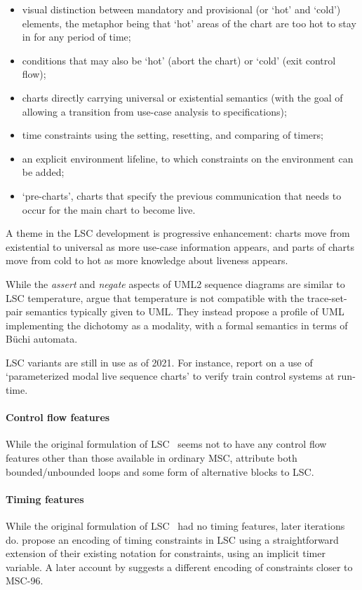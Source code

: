 \begin{itemize}
\item visual distinction between mandatory and provisional (or `hot'
  and `cold') elements, the metaphor being that `hot' areas of the
  chart are too hot to stay in for any period of time;
\item conditions that may also be `hot' (abort the
  chart) or `cold' (exit control flow);
\item charts directly carrying universal or existential semantics (with the
  goal of allowing a transition from use-case analysis to specifications);
\item time constraints using the setting, resetting, and comparing of timers;
\item an explicit environment lifeline, to which constraints on the
  environment can be added;
\item `pre-charts', charts that specify the previous communication
  that needs to occur for the main chart to become live.
\end{itemize}

A theme in the LSC development is progressive enhancement: charts move
from existential to universal as more use-case information appears,
and parts of charts move from cold to hot as more knowledge about
liveness appears.

While the \emph{assert} and \emph{negate} aspects of UML2 sequence diagrams
are similar to LSC temperature, \textcite{Harel08-ModalSD} argue
that temperature is not compatible with the trace-set-pair semantics typically
given to UML.  They instead propose a profile of UML implementing the
dichotomy as a modality, with a formal semantics in terms of B\"uchi automata.

LSC variants are still in use as of 2021.  For instance,
\textcite{Chai21-PMLSC} report on a use of `parameterized modal
live sequence charts' to verify train control systems at run-time.

\paragraph{Control flow features}

While the original formulation of LSC~\cite{lsc} seems not to have any
control flow features other than those available in ordinary MSC,
\textcite{Harel03-MSC} attribute both bounded/unbounded loops and some
form of alternative blocks to LSC.

\paragraph{Timing features}
While the original formulation of LSC~\cite{lsc} had no timing
features, later iterations do.
\textcite{Harel03-MSC} propose an encoding of timing constraints in
LSC using a straightforward extension of their existing notation for
constraints, using an implicit timer variable.  A later account by
\textcite{Brill04-LSCintro} suggests a different encoding of
constraints closer to MSC-96.

